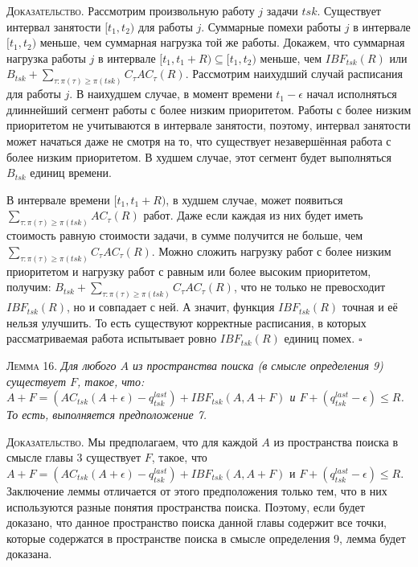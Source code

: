 \textsc{Доказательство.}
  Рассмотрим произвольную работу $j$ задачи $tsk$.
  Существует интервал занятости $[t_1, t_2)$ для работы $j$.
  Суммарные помехи работы $j$ в интервале $[t_1, t_2)$ меньше, чем
    суммарная нагрузка той же работы.
  Докажем, что суммарная нагрузка работы $j$ в интервале $[t_1, t_1 + R) \subseteq [t_1, t_2)$
    меньше, чем $IBF_{tsk}(R)$ или $B_{tsk} + \sum_{\tau: \pi(\tau) \geq \pi(tsk)} C_{\tau}AC_{\tau}(R)$.
  Рассмотрим наихудший случай расписания для работы $j$.
    В наихудшем случае, в момент времени $t_1 - \epsilon$ начал исполняться длиннейший
      сегмент работы с более низким приоритетом. Работы с более низким приоритетом
      не учитываются в интервале занятости, поэтому, интервал занятости может начаться
      даже не смотря на то, что существует незавершённая работа с более низким приоритетом.
    В худшем случае, этот сегмент будет выполняться $B_{tsk}$ единиц времени.

    В интервале времени $[t_1, t_1 + R)$, в худшем случае, может появиться
      $\sum_{\tau: \pi(\tau) \geq \pi(tsk)} AC_{\tau}(R)$ работ.
    Даже если каждая из них будет иметь стоимость равную стоимости задачи,
      в сумме получится не больше, чем $\sum_{\tau: \pi(\tau) \geq \pi(tsk)} C_{\tau}AC_{\tau}(R)$.
    Можно сложить нагрузку работ с более низким приоритетом и нагрузку работ
      с равным или более высоким приоритетом, получим: $B_{tsk} + \sum_{\tau: \pi(\tau) \geq \pi(tsk)} C_{\tau}AC_{\tau}(R)$,
      что не только не превосходит $IBF_{tsk}(R)$, но и совпадает с ней.
    А значит, функция $IBF_{tsk}(R)$ точная и её нельзя улучшить. То есть
      существуют корректные расписания, в которых рассматриваемая работа
      испытывает ровно $IBF_{tsk}(R)$ единиц помех.
$\square$


\textsc{Лемма 16.}
\textit{Для любого $A$ из пространства поиска (в смысле определения 9)
  существует $F$, такое, что:
    $A + F = (AC_{tsk}(A + \epsilon) - q_{tsk}^{last}) + IBF_{tsk}(A, A + F)$
    и $F + (q_{tsk}^{last} - \epsilon) \leq R$.
  То есть, выполняется предположение 7. }

\textsc{Доказательство.} Мы предполагаем, что для каждой $A$ из пространства
  поиска в смысле главы 3 существует $F$, такое, что
    $A + F = (AC_{tsk}(A + \epsilon) - q_{tsk}^{last}) + IBF_{tsk}(A, A + F)$
    и $F + (q_{tsk}^{last} - \epsilon) \leq R$.
  Заключение леммы отличается от этого предположения только тем, что
    в них используются разные понятия пространства поиска.
  Поэтому, если будет доказано, что данное пространство поиска данной главы
    содержит все точки, которые содержатся в пространстве поиска в смысле определения 9,
    лемма будет доказана.

